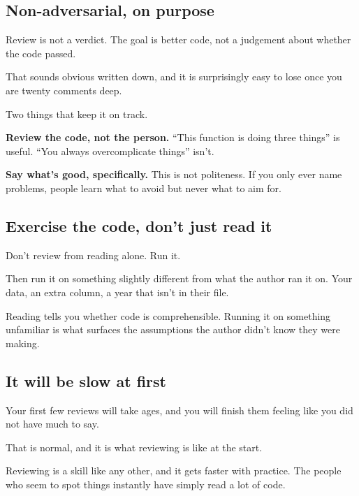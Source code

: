 \documentclass[
  letterpaper,
  justified,
  a4paper]{tufte-book}
\begin{document}
\subsection{Non-adversarial, on
purpose}\label{non-adversarial-on-purpose}

Review is not a verdict. The goal is better code, not a judgement about
whether the code passed.

That sounds obvious written down, and it is surprisingly easy to lose
once you are twenty comments deep.

Two things that keep it on track.

\textbf{Review the code, not the person.} ``This function is doing three
things'' is useful. ``You always overcomplicate things'' isn't.

\textbf{Say what's good, specifically.} This is not politeness. If you
only ever name problems, people learn what to avoid but never what to
aim for.

\subsection{Exercise the code, don't just read
it}\label{exercise-the-code-dont-just-read-it}

Don't review from reading alone. Run it.

Then run it on something slightly different from what the author ran it
on. Your data, an extra column, a year that isn't in their file.

Reading tells you whether code is comprehensible. Running it on
something unfamiliar is what surfaces the assumptions the author didn't
know they were making.

\subsection{It will be slow at first}\label{it-will-be-slow-at-first}

Your first few reviews will take ages, and you will finish them feeling
like you did not have much to say.

That is normal, and it is what reviewing is like at the start.

Reviewing is a skill like any other, and it gets faster with practice.
The people who seem to spot things instantly have simply read a lot of
code.
\end{document}
